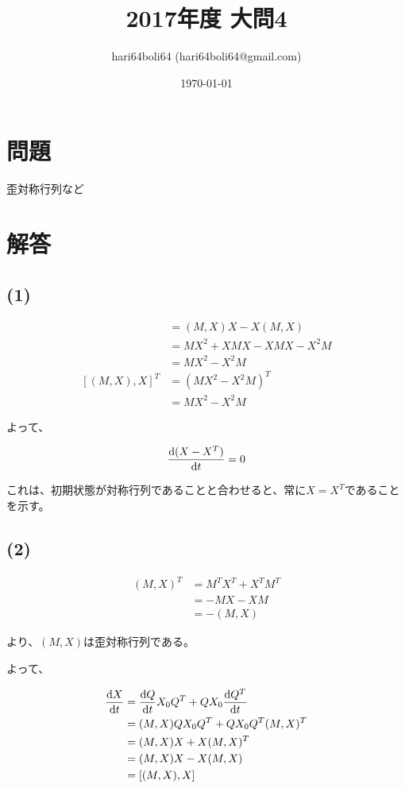 \documentclass[a4paper, 10pt, dvipdfmx]{jlreq}
\begin{document}
\title{2017年度 大問4}
\author{hari64boli64 (hari64boli64@gmail.com)}
\date{\today}
\maketitle

\section{問題}

歪対称行列など

\section{解答}

\subsection*{(1)}

\begin{align*}
    [(M,X),X]   & =(M,X)X-X(M,X)     \\
                & =MX^2+XMX-XMX-X^2M \\
                & =MX^2-X^2M         \\
    [(M,X),X]^T & =(MX^2-X^2M)^T     \\
                & =MX^2-X^2M
\end{align*}

よって、

\begin{align*}
    \dv{(X-X^T)}{t}=0 \\
\end{align*}

これは、初期状態が対称行列であることと合わせると、常に$X=X^T$であることを示す。

\subsection*{(2)}

\begin{align*}
    (M,X)^T & =M^TX^T+X^TM^T \\
            & =-MX-XM        \\
            & =-(M,X)
\end{align*}

より、$(M,X)$は歪対称行列である。

よって、

\begin{align*}
    \dv{X}{t} & =\dv{Q}{t}X_0Q^T+QX_0\dv{Q^T}{t} \\
              & =(M,X)QX_0Q^T+QX_0Q^T(M,X)^T     \\
              & =(M,X)X+X(M,X)^T                 \\
              & =(M,X)X-X(M,X)                   \\
              & =[(M,X),X]
\end{align*}
\end{document}
